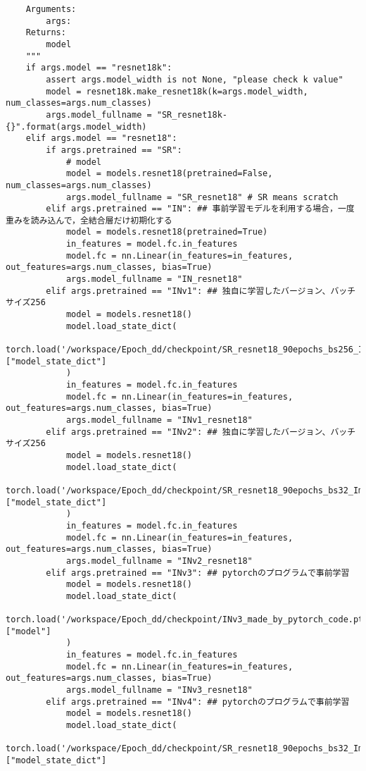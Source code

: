 {\begin{verbatim}
    Arguments:
        args: 
    Returns:
        model
    """
    if args.model == "resnet18k":
        assert args.model_width is not None, "please check k value"
        model = resnet18k.make_resnet18k(k=args.model_width, num_classes=args.num_classes)
        args.model_fullname = "SR_resnet18k-{}".format(args.model_width)
    elif args.model == "resnet18":
        if args.pretrained == "SR":
            # model
            model = models.resnet18(pretrained=False, num_classes=args.num_classes)
            args.model_fullname = "SR_resnet18" # SR means scratch
        elif args.pretrained == "IN": ## 事前学習モデルを利用する場合，一度重みを読み込んで，全結合層だけ初期化する
            model = models.resnet18(pretrained=True)
            in_features = model.fc.in_features
            model.fc = nn.Linear(in_features=in_features, out_features=args.num_classes, bias=True)
            args.model_fullname = "IN_resnet18"
        elif args.pretrained == "INv1": ## 独自に学習したバージョン、バッチサイズ256
            model = models.resnet18()
            model.load_state_dict(
            torch.load('/workspace/Epoch_dd/checkpoint/SR_resnet18_90epochs_bs256_ImageNet_ln0pc.tar')["model_state_dict"]
            )
            in_features = model.fc.in_features
            model.fc = nn.Linear(in_features=in_features, out_features=args.num_classes, bias=True)
            args.model_fullname = "INv1_resnet18"
        elif args.pretrained == "INv2": ## 独自に学習したバージョン、バッチサイズ256
            model = models.resnet18()
            model.load_state_dict(
            torch.load('/workspace/Epoch_dd/checkpoint/SR_resnet18_90epochs_bs32_ImageNet_ln0pc.tar')["model_state_dict"]
            )
            in_features = model.fc.in_features
            model.fc = nn.Linear(in_features=in_features, out_features=args.num_classes, bias=True)
            args.model_fullname = "INv2_resnet18"
        elif args.pretrained == "INv3": ## pytorchのプログラムで事前学習
            model = models.resnet18()
            model.load_state_dict(
            torch.load('/workspace/Epoch_dd/checkpoint/INv3_made_by_pytorch_code.pth')["model"]
            )
            in_features = model.fc.in_features
            model.fc = nn.Linear(in_features=in_features, out_features=args.num_classes, bias=True)
            args.model_fullname = "INv3_resnet18"
        elif args.pretrained == "INv4": ## pytorchのプログラムで事前学習
            model = models.resnet18()
            model.load_state_dict(
            torch.load('/workspace/Epoch_dd/checkpoint/SR_resnet18_90epochs_bs32_ImageNet_ln0pc_v2.tar')["model_state_dict"]

\end{verbatim}}
